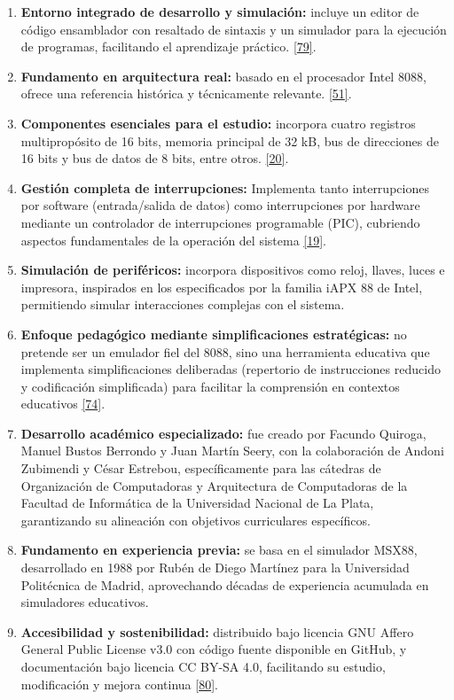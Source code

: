 \documentclass[12pt,oneside]{templates/unerthesis}
\begin{document}
\begin{enumerate}
\def\labelenumi{\arabic{enumi}.}
\item
  \textbf{Entorno integrado de desarrollo y simulación:} incluye un editor de código ensamblador con resaltado de sintaxis y un simulador para la ejecución de programas, facilitando el aprendizaje práctico. \protect\hyperlink{ref-vonsim}{{[}79{]}}.
\item
  \textbf{Fundamento en arquitectura real:} basado en el procesador Intel 8088, ofrece una referencia histórica y técnicamente relevante. \protect\hyperlink{ref-intel8086manual}{{[}51{]}}.
\item
  \textbf{Componentes esenciales para el estudio:} incorpora cuatro registros multipropósito de 16 bits, memoria principal de 32 kB, bus de direcciones de 16 bits y bus de datos de 8 bits, entre otros. \protect\hyperlink{ref-stallings_computer_2021}{{[}20{]}}.
\item
  \textbf{Gestión completa de interrupciones:} Implementa tanto interrupciones por software (entrada/salida de datos) como interrupciones por hardware mediante un controlador de interrupciones programable (PIC), cubriendo aspectos fundamentales de la operación del sistema \protect\hyperlink{ref-hennessy2017computer}{{[}19{]}}.
\item
  \textbf{Simulación de periféricos:} incorpora dispositivos como reloj, llaves, luces e impresora, inspirados en los especificados por la familia iAPX 88 de Intel, permitiendo simular interacciones complejas con el sistema.
\item
  \textbf{Enfoque pedagógico mediante simplificaciones estratégicas:} no pretende ser un emulador fiel del 8088, sino una herramienta educativa que implementa simplificaciones deliberadas (repertorio de instrucciones reducido y codificación simplificada) para facilitar la comprensión en contextos educativos \protect\hyperlink{ref-patt2019introduction}{{[}74{]}}.
\item
  \textbf{Desarrollo académico especializado:} fue creado por Facundo Quiroga, Manuel Bustos Berrondo y Juan Martín Seery, con la colaboración de Andoni Zubimendi y César Estrebou, específicamente para las cátedras de Organización de Computadoras y Arquitectura de Computadoras de la Facultad de Informática de la Universidad Nacional de La Plata, garantizando su alineación con objetivos curriculares específicos.
\item
  \textbf{Fundamento en experiencia previa:} se basa en el simulador MSX88, desarrollado en 1988 por Rubén de Diego Martínez para la Universidad Politécnica de Madrid, aprovechando décadas de experiencia acumulada en simuladores educativos.
\item
  \textbf{Accesibilidad y sostenibilidad:} distribuido bajo licencia GNU Affero General Public License v3.0 con código fuente disponible en GitHub, y documentación bajo licencia CC BY-SA 4.0, facilitando su estudio, modificación y mejora continua \protect\hyperlink{ref-opensource_licensing_2024}{{[}80{]}}.
\end{enumerate}
\end{document}
